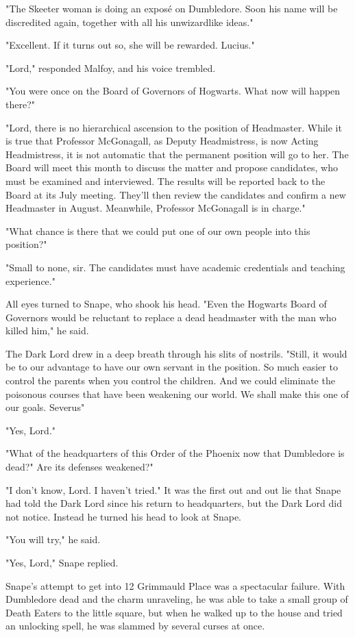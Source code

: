 "The Skeeter woman is doing an exposé on Dumbledore. Soon his name will be discredited again, together with all his unwizardlike ideas."

"Excellent. If it turns out so, she will be rewarded. Lucius."

"Lord," responded Malfoy, and his voice trembled.

"You were once on the Board of Governors of Hogwarts. What now will happen there?"

"Lord, there is no hierarchical ascension to the position of Headmaster. While it is true that Professor McGonagall, as Deputy Headmistress, is now Acting Headmistress, it is not automatic that the permanent position will go to her. The Board will meet this month to discuss the matter and propose candidates, who must be examined and interviewed. The results will be reported back to the Board at its July meeting. They'll then review the candidates and confirm a new Headmaster in August. Meanwhile, Professor McGonagall is in charge."

"What chance is there that we could put one of our own people into this position?"

"Small to none, sir. The candidates must have academic credentials and teaching experience."

All eyes turned to Snape, who shook his head. "Even the Hogwarts Board of Governors would be reluctant to replace a dead headmaster with the man who killed him," he said.

The Dark Lord drew in a deep breath through his slits of nostrils. "Still, it would be to our advantage to have our own servant in the position. So much easier to control the parents when you control the children. And we could eliminate the poisonous courses that have been weakening our world. We shall make this one of our goals. Severus{\el}"

"Yes, Lord."

"What of the headquarters of this Order of the Phoenix now that Dumbledore is dead?" Are its defenses weakened?"

"I don't know, Lord. I haven't tried." It was the first out and out lie that Snape had told the Dark Lord since his return to headquarters, but the Dark Lord did not notice. Instead he turned his head to look at Snape.

"You will try," he said.

"Yes, Lord," Snape replied.

Snape's attempt to get into 12 Grimmauld Place was a spectacular failure. With Dumbledore dead and the charm unraveling, he was able to take a small group of Death Eaters to the little square, but when he walked up to the house and tried an unlocking spell, he was slammed by several curses at once.

